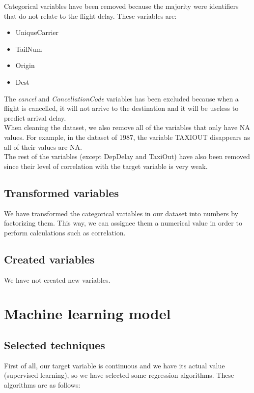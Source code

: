 Categorical variables have been removed because the majority were identifiers that do not relate to the flight delay. These variables are:

\begin{itemize}
	\item UniqueCarrier
	\item TailNum
	\item Origin
	\item Dest
\end{itemize}

The \textit{cancel} and \textit{CancellationCode} variables has been excluded because when a flight is cancelled, it will not arrive to the destination and it will be useless to predict arrival delay.\\

When cleaning the dataset, we also remove all of the variables that only have NA values. For example, in the dataset of 1987, the variable TAXIOUT disappears as all of their values are NA.\\

The rest of the variables (except DepDelay and TaxiOut) have also been removed since their level of correlation with the target variable is very weak.

\subsection{Transformed variables}
We have transformed the categorical variables in our dataset into numbers by factorizing them. This way, we can assignee them a numerical value in order to perform calculations such as correlation.

\subsection{Created variables}
We have not created new variables.

\section{Machine learning model}

\subsection{Selected techniques}

First of all, our target variable is continuous and we have its actual value (supervised learning), so we have selected some regression algorithms. These algorithms are as follows:


